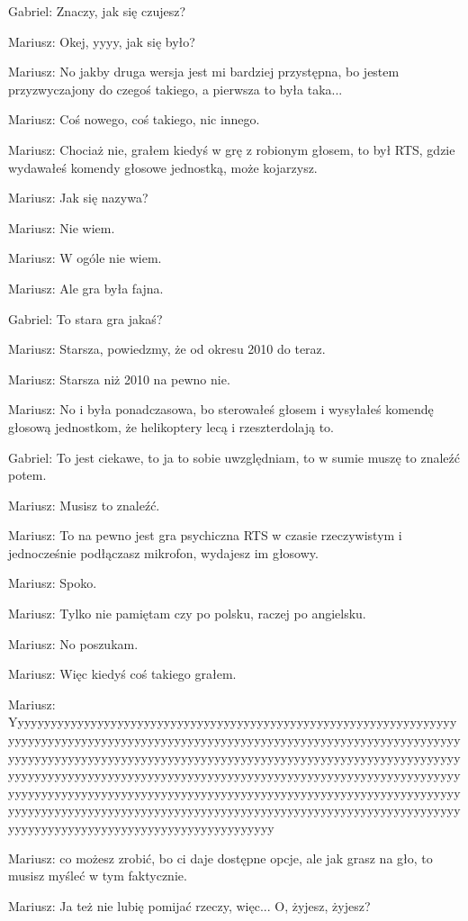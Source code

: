 Gabriel: Znaczy, jak się czujesz?

Mariusz: Okej, yyyy, jak się było?

Mariusz: No jakby druga wersja jest mi bardziej przystępna, bo jestem przyzwyczajony do czegoś takiego, a pierwsza to była taka...

Mariusz: Coś nowego, coś takiego, nic innego.

Mariusz: Chociaż nie, grałem kiedyś w grę z robionym głosem, to był RTS, gdzie wydawałeś komendy głosowe jednostką, może kojarzysz.

Mariusz: Jak się nazywa?

Mariusz: Nie wiem.

Mariusz: W ogóle nie wiem.

Mariusz: Ale gra była fajna.

Gabriel: To stara gra jakaś?

Mariusz: Starsza, powiedzmy, że od okresu 2010 do teraz.

Mariusz: Starsza niż 2010 na pewno nie.

Mariusz: No i była ponadczasowa, bo sterowałeś głosem i wysyłałeś komendę głosową jednostkom, że helikoptery lecą i rzeszterdolają to.

Gabriel: To jest ciekawe, to ja to sobie uwzględniam, to w sumie muszę to znaleźć potem.

Mariusz: Musisz to znaleźć.

Mariusz: To na pewno jest gra psychiczna RTS w czasie rzeczywistym i jednocześnie podłączasz mikrofon, wydajesz im głosowy.

Mariusz: Spoko.

Mariusz: Tylko nie pamiętam czy po polsku, raczej po angielsku.

Mariusz: No poszukam.

Mariusz: Więc kiedyś coś takiego grałem.

Mariusz: Yyyyyyyyyyyyyyyyyyyyyyyyyyyyyyyyyyyyyyyyyyyyyyyyyyyyyyyyyyyyyyyyyyyyyyyyyyyyyyyyyyyyyyyyyyyyyyyyyyyyyyyyyyyyyyyyyyyyyyyyyyyyyyyyyyyyyyyyyyyyyyyyyyyyyyyyyyyyyyyyyyyyyyyyyyyyyyyyyyyyyyyyyyyyyyyyyyyyyyyyyyyyyyyyyyyyyyyyyyyyyyyyyyyyyyyyyyyyyyyyyyyyyyyyyyyyyyyyyyyyyyyyyyyyyyyyyyyyyyyyyyyyyyyyyyyyyyyyyyyyyyyyyyyyyyyyyyyyyyyyyyyyyyyyyyyyyyyyyyyyyyyyyyyyyyyyyyyyyyyyyyyyyyyyyyyyyyyyyyyyyyyyyyyyyyyyyyyyyyyyyyyyyyyyyyyyyyyyyyyyyyyyyyyyyyyyyyyyyyyyyyyyyyy

Mariusz: co możesz zrobić, bo ci daje dostępne opcje, ale jak grasz na gło, to musisz myśleć w tym faktycznie.

Mariusz: Ja też nie lubię pomijać rzeczy, więc... O, żyjesz, żyjesz?

